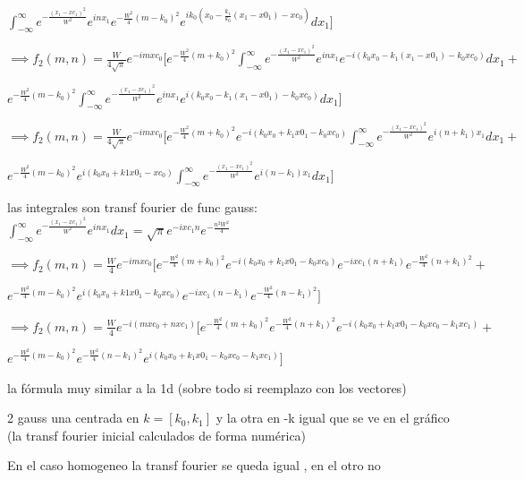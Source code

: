 \documentclass{article}
\begin{document}
\begin{description}
$   \int_{- \infty}^{\infty}{e^{- \frac{(x_1-xc_1)^2}{W^2}} 
e^{i n x_1}  e^{-\frac{W^2}{4}  (m-k_0)^2} e^{i  k_0 (x_0 - \frac{k_1}{k_0}(x_1 - x0_1) -xc_0)} dx_1 }\big] $


\item $\implies f_2(m,n) = \frac{W}{4 \sqrt{\pi}}  e^{-i  m  xc_0} \big[  e^{-\frac{W^2}{4}  (m+k_0)^2} 
\int_{- \infty}^{\infty}{e^{- \frac{(x_1-xc_1)^2}{W^2}} 
e^{i n x_1} e^{-i  (k_0 x_0 - k_1 (x_1 - x0_1) - k_0 xc_0)} dx_1}  + $ 

$  e^{-\frac{W^2}{4}  (m-k_0)^2}   \int_{- \infty}^{\infty}{e^{- \frac{(x_1-xc_1)^2}{W^2}} 
e^{i n x_1}  e^{i  (k_0 x_0 -k_1(x_1 - x0_1) -k_0 xc_0)} dx_1 }\big] $

\item $\implies f_2(m,n) = \frac{W}{4 \sqrt{\pi}}  e^{-i  m  xc_0} \big[  e^{-\frac{W^2}{4} (m+k_0)^2} e^{-i  (k_0 x_0 + k_1 x0_1 - k_0 xc_0)}  
\int_{- \infty}^{\infty}{e^{- \frac{(x_1-xc_1)^2}{W^2}} 
e^{i (n +k_1) x_1}  dx_1}  + $ 

$  e^{-\frac{W^2}{4}  (m-k_0)^2}  e^{i  (k_0 x_0 + k1 x0_1 -xc_0)}   \int_{- \infty}^{\infty}{e^{- \frac{(x_1-xc_1)^2}{W^2}} 
e^{i (n-k_1) x_1}  dx_1 }\big] $
\item las integrales son transf fourier de func gauss:
$\int_{- \infty}^{\infty}{e^{- \frac{(x_1-xc_1)^2}{W^2}} 
e^{i n x_1}  dx_1 }  = \sqrt{\pi} e^{-i xc_1 n } e^{-\frac{n^2 W^2}{4}} $

\item $\implies f_2(m,n) = \frac{W}{4}  e^{-i  m  xc_0} \big[  e^{-\frac{W^2}{4} (m+k_0)^2} e^{-i  (k_0 x_0 + k_1 x0_1 - k_0 xc_0)}  
e^{-i xc_1 (n+k_1) } e^{-\frac{W^2}{4}(n+k_1)^2} + $

$  e^{-\frac{W^2}{4}  (m-k_0)^2}  e^{i  (k_0 x_0 + k1 x0_1 -k_0 xc_0)}  e^{-i xc_1 (n-k_1) } e^{-\frac{W^2}{4}(n-k_1)^2}  \big] $

\item $\implies f_2(m,n) = \frac{W}{4} e^{-i  (m  xc_0 + n xc_1)}  \big[  e^{-\frac{W^2}{4} (m+k_0)^2}   
e^{-\frac{W^2}{4}(n+k_1)^2} e^{-i  (k_0 x_0 + k_1 x0_1 - k_0 xc_0 - k_1 xc_1)}+ $

$  e^{-\frac{W^2}{4}  (m-k_0)^2}   e^{-\frac{W^2}{4}(n-k_1)^2} e^{i  (k_0 x_0 + k_1 x0_1 - k_0 xc_0 - k_1 xc_1)} \big] $

\item la fórmula muy similar a la 1d (sobre todo si reemplazo con los vectores)
\item 2 gauss una centrada en $k=[k_0,k_1]$ y la otra en -k igual que se ve en el gráfico  (la transf fourier inicial calculados de forma numérica)
\item En el caso homogeneo la transf fourier se queda igual , en el otro no

\end{description}
\end{document}
